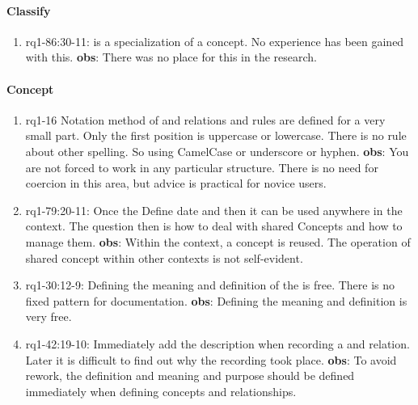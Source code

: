 \paragraph{Classify}
\begin{enumerate}
    \item rq1-86:30-11:  is a specialization of a concept.
    No experience has been gained with this.
    \newline\textbf{obs}: There was no place for this in the research.

\end{enumerate}

\paragraph{Concept}
\begin{enumerate}
    \item rq1-16 Notation method of  and {relation}s and {rule}s are defined for a very small part.
    Only the first position is uppercase or lowercase.
    There is no rule about other spelling.
    So using CamelCase or underscore or hyphen.
    \newline\textbf{obs}: You are not forced to work in any particular structure.
    There is no need for coercion in this area, but advice is practical for novice users.
     
    \item rq1-79:20-11: Once the  Define date and then it can be used anywhere in the context.
    The question then is how to deal with shared Concepts and how to manage them.
    \newline\textbf{obs}: Within the context, a concept is reused.
    The operation of shared concept within other contexts is not self-evident.
     
    \item rq1-30:12-9: Defining the meaning and definition of the  is free.
    There is no fixed pattern for documentation.
    \newline\textbf{obs}: Defining the meaning and definition is very free.
     
    \item rq1-42:19-10: Immediately add the description when recording a  and {relation}.
    Later it is difficult to find out why the recording took place.
    \newline\textbf{obs}: To avoid rework, the definition and meaning and purpose should be defined immediately when defining concepts and relationships.


\end{enumerate}
